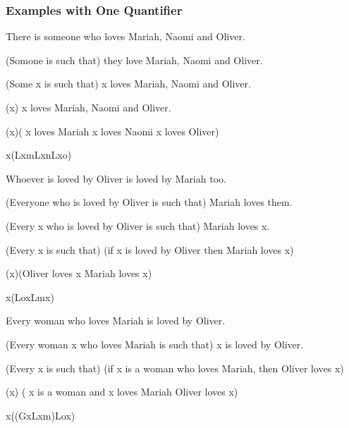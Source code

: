 \subsubsection{Examples with One Quantifier}

\begin{argument}
\item[\textbf{(1)}] There is someone who loves Mariah, Naomi and Oliver.
\item[$\simeq$] (Somone is such that) they love Mariah, Naomi and Oliver.
\item[$\simeq$] (Some x is such that) x loves Mariah, Naomi and Oliver.
\item[$\simeq$] (\eexists x) x loves Mariah, Naomi and Oliver.
\item[$\simeq$] (\eexists x)( x loves Mariah \eand x loves Naomi
  \eand x loves Oliver)  
\item[$\simeq$] \eexists x(Lxm\eand Lxn\eand Lxo)
\end{argument}

\begin{argument}
\item[\textbf{(2)}] Whoever is loved by Oliver is loved by Mariah too.
\item[$\simeq$] (Everyone who is loved by Oliver is such that)
  Mariah loves them.
\item[$\simeq$] (Every x who is loved by Oliver is such that)
  Mariah loves x.
\item[$\simeq$] (Every x is such that)
  (if x is loved by Oliver then Mariah loves x)
\item[$\simeq$] (\eforall x)(Oliver loves x \eif Mariah loves x)
\item[$\simeq$] \eforall x(Lox\eif Lmx)
\end{argument}

\begin{argument}
\item[\textbf{(3)}] Every woman who loves Mariah is loved by Oliver.
\item[$\simeq$] (Every woman x who loves Mariah is such that)
  x is loved by Oliver.
\item[$\simeq$] (Every x is such that)
  (if x is a woman who loves Mariah, then Oliver loves x)
\item[$\simeq$] (\eforall x)
  ( x is a woman and x loves Mariah \eif Oliver loves x)  
\item[$\simeq$] \eforall x((Gx\eand Lxm)\eif Lox)
\end{argument}

